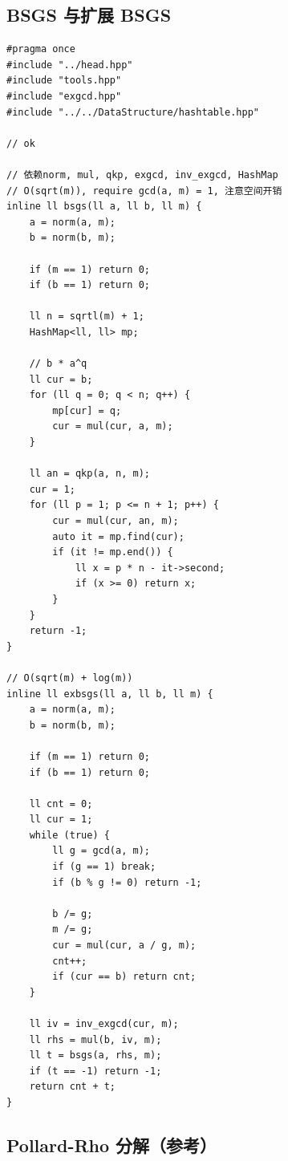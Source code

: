 \subsection{BSGS 与扩展 BSGS}
\par

\begin{lstlisting}
#pragma once
#include "../head.hpp"
#include "tools.hpp"
#include "exgcd.hpp"
#include "../../DataStructure/hashtable.hpp"

// ok

// 依赖norm, mul, qkp, exgcd, inv_exgcd, HashMap
// O(sqrt(m)), require gcd(a, m) = 1, 注意空间开销
inline ll bsgs(ll a, ll b, ll m) {
    a = norm(a, m);
    b = norm(b, m);

    if (m == 1) return 0;
    if (b == 1) return 0;

    ll n = sqrtl(m) + 1;
    HashMap<ll, ll> mp;

    // b * a^q
    ll cur = b;
    for (ll q = 0; q < n; q++) {
        mp[cur] = q;
        cur = mul(cur, a, m);
    }

    ll an = qkp(a, n, m);
    cur = 1;
    for (ll p = 1; p <= n + 1; p++) {
        cur = mul(cur, an, m);
        auto it = mp.find(cur);
        if (it != mp.end()) {
            ll x = p * n - it->second;
            if (x >= 0) return x;
        }
    }
    return -1;
}

// O(sqrt(m) + log(m))
inline ll exbsgs(ll a, ll b, ll m) {
    a = norm(a, m);
    b = norm(b, m);

    if (m == 1) return 0;
    if (b == 1) return 0;

    ll cnt = 0;
    ll cur = 1;
    while (true) {
        ll g = gcd(a, m);
        if (g == 1) break;
        if (b % g != 0) return -1;

        b /= g;
        m /= g;
        cur = mul(cur, a / g, m);
        cnt++;
        if (cur == b) return cnt;
    }

    ll iv = inv_exgcd(cur, m);
    ll rhs = mul(b, iv, m);
    ll t = bsgs(a, rhs, m);
    if (t == -1) return -1;
    return cnt + t;
}
\end{lstlisting}

\subsection{Pollard-Rho 分解（参考）}
\par

